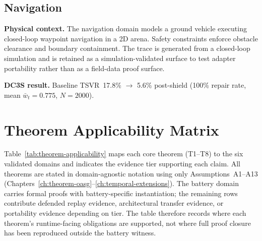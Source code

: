 \subsection{Navigation}
\label{sec:profile-navigation}

\textbf{Physical context.}
The navigation domain models a ground vehicle executing closed-loop
waypoint navigation in a 2D arena.  Safety constraints enforce obstacle
clearance and boundary containment.  The trace is generated from a
closed-loop simulation and is retained as a simulation-validated surface
to test adapter portability rather than as a field-data proof surface.

\textbf{DC3S result.}
Baseline TSVR~17.8\% $\rightarrow$ 5.6\% post-shield (100\% repair rate,
mean $\bar{w}_t = 0.775$, $N = 2000$).

\section{Theorem Applicability Matrix}
\label{sec:theorem-applicability}

Table~\ref{tab:theorem-applicability} maps each core theorem (T1--T8)
to the six validated domains and indicates the evidence tier supporting
each claim.  All theorems are stated in domain-agnostic notation using
only Assumptions~A1--A13 (Chapters~\ref{ch:theorem-oasg}--\ref{ch:temporal-extensions}).
The battery domain carries formal proofs with battery-specific
instantiation; the remaining rows contribute defended replay evidence,
architectural transfer evidence, or portability evidence depending on
tier.  The table therefore records where each theorem's runtime-facing
obligations are supported, not where full proof closure has been
reproduced outside the battery witness.

